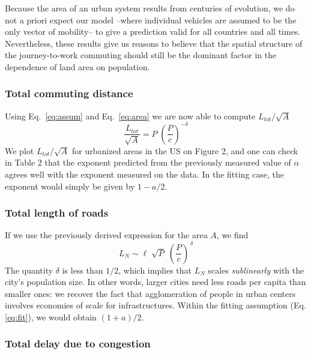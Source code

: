 Because the area of an urban system results from centuries of evolution, we do not a priori expect our model --where individual vehicles are assumed to be the only vector of mobility-- to give a prediction valid for all countries and all times. Nevertheless, these results give us reasons to believe that the spatial structure of the journey-to-work commuting should still be the dominant factor in the dependence of land area on population.


\subsubsection{Total commuting distance}
Using Eq.~\ref{eq:assum} and Eq.~\ref{eq:area} we are now able to compute $L_{tot}/\sqrt{A}$
%
\begin{equation}
\frac{L_{tot}}{\sqrt{A}} = P\; \left(\frac{P}{c}\right)^{-\delta}
\label{eq:travelled_length}
\end{equation}
%
We plot $L_{tot} / \sqrt{A}$ for urbanized areas in the US on Figure 2, and one can check in Table 2 that the exponent predicted from the previously measured value of $\alpha$ agrees well with the exponent measured on the data. In the fitting case, the exponent would simply be given by $1-a/2$.


\subsubsection{Total length of roads}
If we use the previously derived expression for the area $A$, we find
%
\begin{equation}
L_N \sim \ell \; \sqrt{P}\; \left(\frac{P}{c}\right)^{\,\delta}
\end{equation}
%
The quantity $\delta$ is less than $1/2$, which implies that $L_N$ scales \emph{sublinearly} with the city's population size. In other words, larger cities need less roads per capita than smaller ones: we recover the fact that agglomeration of people in urban centers involves economies of scale for infrastructures. Within the fitting assumption (Eq.\ref{eq:fit}), we would obtain $(1+a)/2$.

\subsubsection{Total delay due to congestion}

